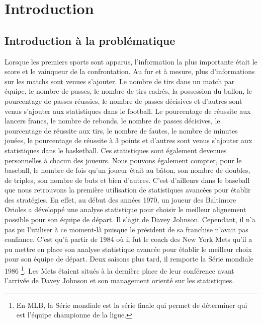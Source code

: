 \documentclass[12pt]{article}
\begin{document}
\newpage

\tableofcontents
\newpage

\section{Introduction}

\subsection{Introduction à la problématique}
Lorsque les premiers sports sont apparus, l'information la plus importante était le score et le vainqueur de la confrontation.
Au fur et à mesure, plus d'informations sur les matchs sont venues s'ajouter.
Le nombre de tirs dans un match par équipe, le nombre de passes, le nombre de tirs cadrés, la possession du ballon, le pourcentage de passes réussies, le nombre de passes décisives et d'autres sont venus s'ajouter aux statistiques dans le football.
Le pourcentage de réussite aux lancers francs, le nombre de rebonds, le nombre de passes décisives, le pourcentage de réussite aux tirs, le nombre de fautes, le nombre de minutes jouées, le pourcentage de réussite à 3 points et d'autres sont venus s'ajouter aux statistiques dans le basketball.
Ces statistiques sont également devenues personnelles à chacun des joueurs.
Nous pouvons également compter, pour le baseball, le nombre de fois qu'un joueur était au bâton, son nombre de doubles, de triples, son nombre de buts et bien d'autres.
\newline\newline
C'est d'ailleurs dans le baseball que nous retrouvons la première utilisation de statistiques avancées pour établir des stratégies.
En effet, au début des années 1970, un joueur des Baltimore Orioles a développé une analyse statistique pour choisir le meilleur alignement possible pour son équipe de départ.
Il s'agit de Davey Johnson.
Cependant, il n'a pas pu l'utiliser à ce moment-là puisque le président de sa franchise n'avait pas confiance. C'est qu'à partir de 1984 où il fut le coach des New York Mets qu'il a pu mettre en place son analyse statistique avancée pour établir le meilleur choix pour son équipe de départ. \cite{incPCMag1984}
Deux saisons plus tard, il remporte la Série mondiale 1986 \footnote{En MLB, la Série mondiale est la série finale qui permet de déterminer qui est l'équipe championne de la ligue.}. Les Mets étaient situés à la dernière place de leur conférence avant l'arrivée de Davey Johnson et son management orienté sur les statistiques.
\end{document}
